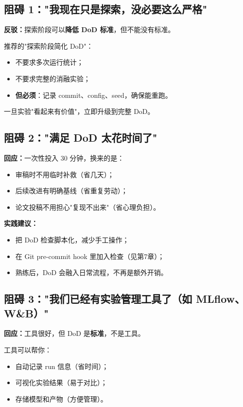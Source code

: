 \subsection{阻碍 1："我现在只是探索，没必要这么严格"}

\textbf{反驳：}探索阶段可以\textbf{降低 DoD 标准}，但不能没有标准。

推荐的"探索阶段简化 DoD"：
\begin{itemize}
  \item 不要求多次运行统计；
  \item 不要求完整的消融实验；
  \item \textbf{但必须}：记录 commit、config、seed，确保能重跑。
\end{itemize}

一旦实验"看起来有价值"，立即升级到完整 DoD。

\subsection{阻碍 2："满足 DoD 太花时间了"}

\textbf{回应：}一次性投入 30 分钟，换来的是：
\begin{itemize}
  \item 审稿时不用临时补救（省几天）；
  \item 后续改进有明确基线（省重复劳动）；
  \item 论文投稿不用担心"复现不出来"（省心理负担）。
\end{itemize}

\textbf{实践建议：}
\begin{itemize}
  \item 把 DoD 检查脚本化，减少手工操作；
  \item 在 Git pre-commit hook 里加入检查（见第7章）；
  \item 熟练后，DoD 会融入日常流程，不再是额外开销。
\end{itemize}

\subsection{阻碍 3："我们已经有实验管理工具了（如 MLflow、W\&B）"}

\textbf{回应：}工具很好，但 DoD 是\textbf{标准}，不是工具。

工具可以帮你：
\begin{itemize}
  \item 自动记录 run 信息（省时间）；
  \item 可视化实验结果（易于对比）；
  \item 存储模型和产物（方便管理）。
\end{itemize}

